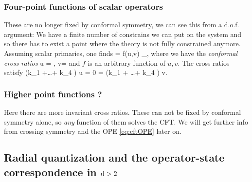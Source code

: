 \subsubsection{Four-point functions of scalar operators}
These are no longer fixed by conformal symmetry, we can see this from a d.o.f. argument: We have a finite number of constrains we can put on the system and so there has to exist a point where the theory is not fully constrained anymore. Assuming scalar primaries, one finds
\be 
\label{eq:cftCorrelatorFourPoint}
 = f(u,v) _{},
\ee 
where we have the \emph{conformal cross ratios}
\bse 
u = , \quad v= 
\ese 
and $f$ is an arbitrary function of $u,v$. The cross ratios satisfy
\bse 
(k_{1\mu} +\dots + k_{4 \mu} ) u = 0 = (k_{1\mu} + \dots + k_{4 \mu} ) v.
\ese

\subsubsection{Higher point functions ?}
Here there are more invariant cross ratios. These can not be fixed by conformal symmetry alone, so \emph{any} function of them solves the CFT. We will get further info from crossing symmetry and the OPE \ref{eq:cftOPE} later on.








\subsection{Radial quantization and the operator-state correspondence in $\mathrm{d}>2$} 
